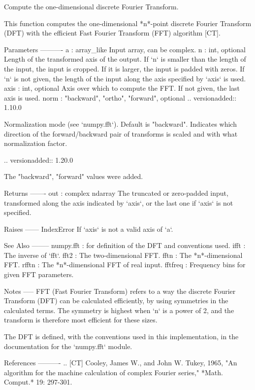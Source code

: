 \begin{DoxyVerb}Compute the one-dimensional discrete Fourier Transform.

This function computes the one-dimensional *n*-point discrete Fourier
Transform (DFT) with the efficient Fast Fourier Transform (FFT)
algorithm [CT].

Parameters
----------
a : array_like
    Input array, can be complex.
n : int, optional
    Length of the transformed axis of the output.
    If `n` is smaller than the length of the input, the input is cropped.
    If it is larger, the input is padded with zeros.  If `n` is not given,
    the length of the input along the axis specified by `axis` is used.
axis : int, optional
    Axis over which to compute the FFT.  If not given, the last axis is
    used.
norm : {"backward", "ortho", "forward"}, optional
    .. versionadded:: 1.10.0

    Normalization mode (see `numpy.fft`). Default is "backward".
    Indicates which direction of the forward/backward pair of transforms
    is scaled and with what normalization factor.

    .. versionadded:: 1.20.0

        The "backward", "forward" values were added.

Returns
-------
out : complex ndarray
    The truncated or zero-padded input, transformed along the axis
    indicated by `axis`, or the last one if `axis` is not specified.

Raises
------
IndexError
    If `axis` is not a valid axis of `a`.

See Also
--------
numpy.fft : for definition of the DFT and conventions used.
ifft : The inverse of `fft`.
fft2 : The two-dimensional FFT.
fftn : The *n*-dimensional FFT.
rfftn : The *n*-dimensional FFT of real input.
fftfreq : Frequency bins for given FFT parameters.

Notes
-----
FFT (Fast Fourier Transform) refers to a way the discrete Fourier
Transform (DFT) can be calculated efficiently, by using symmetries in the
calculated terms.  The symmetry is highest when `n` is a power of 2, and
the transform is therefore most efficient for these sizes.

The DFT is defined, with the conventions used in this implementation, in
the documentation for the `numpy.fft` module.

References
----------
.. [CT] Cooley, James W., and John W. Tukey, 1965, "An algorithm for the
        machine calculation of complex Fourier series," *Math. Comput.*
        19: 297-301.


\end{DoxyVerb}
